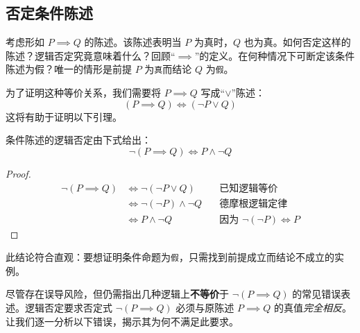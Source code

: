 \subsection{否定条件陈述}

考虑形如 $P \implies Q$ 的陈述。该陈述表明当 $P$ 为真时，$Q$ 也为真。如何否定这样的陈述？逻辑否定究竟意味着什么？回顾``$\implies$''的定义。在何种情况下可断定该条件陈述为假？唯一的情形是前提 $P$ 为\verb|真|而结论 $Q$ 为\verb|假|。

为了证明这种等价关系，我们需要将 $P \implies Q$ 写成``$\lor$''陈述：
\[(P \implies Q) \iff (\neg P \lor Q)\]
这将有助于证明以下引理。

\begin{lemma}
    条件陈述的逻辑否定由下式给出：
    \[\neg (P \implies Q) \iff P \land \neg Q\]
\end{lemma}

\begin{proof}
    \begin{align*}
        \neg (P \implies Q) &\iff \neg (\neg P \lor Q) &\quad \text{已知逻辑等价} \\
        &\iff \neg (\neg P) \land \neg Q &\quad \text{德摩根逻辑定律} \\
        &\iff P \land \neg Q &\quad \text{因为\ } \neg (\neg P) \iff P
    \end{align*}
\end{proof}

此结论符合直观：要想证明条件命题为\verb|假|，只需找到前提成立而结论不成立的实例。

尽管存在误导风险，但仍需指出几种逻辑上\textbf{不等价}于 $\neg (P \implies Q)$ 的常见错误表述。逻辑否定要求否定式 $\neg (P \implies Q)$ 必须与原陈述 $P \implies Q$ 的真值\emph{完全相反}。让我们逐一分析以下错误，揭示其为何不满足此要求。

